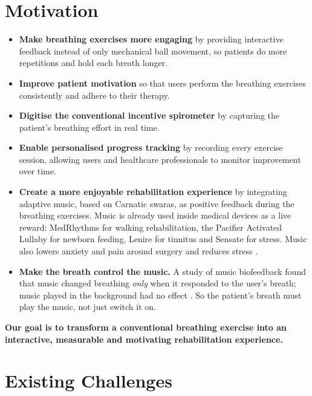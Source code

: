 \documentclass[12pt,a4paper]{article}
\begin{document}
\section{Motivation}
\label{sec:motivation}

\begin{itemize}
  \item \textbf{Make breathing exercises more engaging} by providing interactive feedback instead of only mechanical ball movement, so patients do more repetitions and hold each breath longer.
  \item \textbf{Improve patient motivation} so that users perform the breathing exercises consistently and adhere to their therapy.
  \item \textbf{Digitise the conventional incentive spirometer} by capturing the patient's breathing effort in real time.
  \item \textbf{Enable personalised progress tracking} by recording every exercise session, allowing users and healthcare professionals to monitor improvement over time.
  \item \textbf{Create a more enjoyable rehabilitation experience} by integrating adaptive music, based on Carnatic swaras, as positive feedback during the breathing exercises. Music is already used inside medical devices as a live reward: MedRhythms for walking rehabilitation, the Pacifier Activated Lullaby for newborn feeding, Lenire for tinnitus and Sensate for stress. Music also lowers anxiety and pain around surgery \cite{kuhlmann} and reduces stress \cite{dewitte}.
  \item \textbf{Make the breath control the music.} A study of music biofeedback found that music changed breathing \emph{only} when it responded to the user's breath; music played in the background had no effect \cite{bhandari}. So the patient's breath must play the music, not just switch it on.
\end{itemize}

\textbf{Our goal is to transform a conventional breathing exercise into an interactive, measurable and motivating rehabilitation experience.}

\section{Existing Challenges}
\label{sec:challenges}
\end{document}
